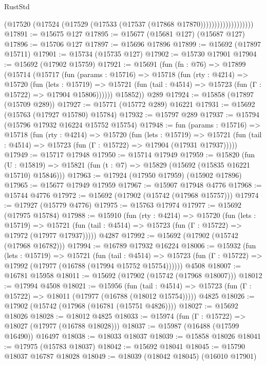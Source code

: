 \begin{lexlean}{RustStd}
\begin{coremodule}
                              (@17520
                                (@17524 (@17529 (@17533 (@17537 (@17868 @17870)))))))))))))))))))
@17891 := @15675 @127
@17895 := @15677 (@15681 @127) (@15687 @127)
@17896 := @15706 @127
@17897 := @15696 @17896
@17899 := @15692 (@17897 @15711)
@17901 := @15734 (@15735 @127)
@17902 := @15730 @17901
@17904 := @15692 (@17902 @15759)
@17921 := @15691
    (fun (fn : @76) =>
    @17899
      (@15714
        (@15717
          (fun (params : @15716) =>
          @15718
            (fun (rty : @4214) =>
            @15720
              (fun (lets : @15719) =>
              @15721 (fun (tail : @4514) => @15723 (fun (Γ : @15722) => @17904 @15806))))))
        @15852))
    @289
@17924 := @15858 (@17897 (@15709 @289))
@17927 := @15771 (@15772 @289) @16221
@17931 := @15692 (@15763 (@17927 @15780) @15784)
@17932 := @15797 @289
@17937 := @15794 (@15796 @17932 @16224 @15752 @15754)
@17948 := fun (params : @15716) =>
  @15718
    (fun (rty : @4214) =>
    @15720
      (fun (lets : @15719) =>
      @15721 (fun (tail : @4514) => @15723 (fun (Γ : @15722) => @17904 (@17931 @17937)))))
@17949 := @15717 @17948
@17950 := @15714 @17949
@17959 := @15820
    (fun (U : @15819) => @15821 (fun (t : @7) => @15829 (@15692 (@15835 @16221 @15710) @15846)))
@17963 := @17924 (@17950 @17959) (@15902 @17896)
@17965 := @15677 @17949 @17959
@17967 := @15907 @17948 @4776
@17968 := @15744 @4776
@17972 := @15692 (@17902 (@15742 (@17968 @15757)))
@17974 := @17927 (@15779 @4776)
@17975 := @15763 @17974
@17977 := @15692 (@17975 @15784)
@17988 := @15910
    (fun (rty : @4214) =>
    @15720
      (fun (lets : @15719) =>
      @15721 (fun (tail : @4514) => @15723 (fun (Γ : @15722) => @17972 (@17977 @17937)))))
    @4287
@17992 := @15692 (@17902 (@15742 (@17968 @16782)))
@17994 := @16789 @17932 @16224
@18006 := @15932
    (fun (lets : @15719) =>
    @15721
      (fun (tail : @4514) =>
      @15723 (fun (Γ : @15722) => @17992 (@17977 (@16788 (@17994 @15752 @15754))))))
    @4508
@18007 := @16781 @15958
@18011 := @15692 (@17902 (@15742 (@17968 @18007)))
@18012 := @17994 @4508
@18021 := @15956
    (fun (tail : @4514) => @15723 (fun (Γ : @15722) => @18011 (@17977 (@16788 (@18012 @15754)))))
    @4825
@18026 := @17902 (@15742 (@17968 (@16781 (@15751 @4826))))
@18027 := @15692 @18026
@18028 := @18012 @4825
@18033 := @15974 (fun (Γ : @15722) => @18027 (@17977 (@16788 @18028)))
@18037 := @15987 (@16488 (@17599 @16490)) @16497
@18038 := @18033 @18037
@18039 := @15858 @18026
@18041 := @17975 (@15783 @18037)
@18042 := @15692 @18041
@18045 := @15790 @18037 @16787 @18028
@18049 := @18039 (@18042 @18045) (@16010 @17901)

\end{coremodule}
\end{lexlean}

